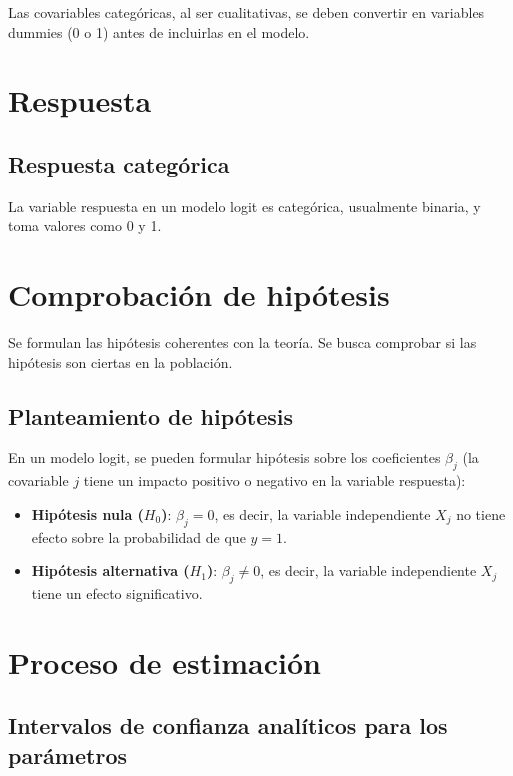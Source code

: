 \documentclass[
  letterpaper,
  DIV=11,
  numbers=noendperiod]{scrreprt}
\providecommand{\tightlist}{%
  \setlength{\itemsep}{0pt}\setlength{\parskip}{0pt}}\usepackage{longtable,booktabs,array}
\begin{document}
Las covariables categóricas, al ser cualitativas, se deben convertir en
variables dummies (0 o 1) antes de incluirlas en el modelo.

\section{Respuesta}\label{respuesta-1}

\subsection{Respuesta categórica}\label{respuesta-categuxf3rica-1}

La variable respuesta en un modelo logit es categórica, usualmente
binaria, y toma valores como 0 y 1.

\section{Comprobación de
hipótesis}\label{comprobaciuxf3n-de-hipuxf3tesis-1}

Se formulan las hipótesis coherentes con la teoría. Se busca comprobar
si las hipótesis son ciertas en la población.

\subsection{Planteamiento de
hipótesis}\label{planteamiento-de-hipuxf3tesis-1}

En un modelo logit, se pueden formular hipótesis sobre los coeficientes
\(\beta_j\) (la covariable \(j\) tiene un impacto positivo o negativo en
la variable respuesta):

\begin{itemize}
\tightlist
\item
  \textbf{Hipótesis nula (\(H_0\))}: \(\beta_j = 0\), es decir, la
  variable independiente \(X_j\) no tiene efecto sobre la probabilidad
  de que \(y = 1\).
\item
  \textbf{Hipótesis alternativa (\(H_1\))}: \(\beta_j \neq 0\), es
  decir, la variable independiente \(X_j\) tiene un efecto
  significativo.
\end{itemize}

\section{Proceso de estimación}\label{proceso-de-estimaciuxf3n-3}

\subsection{Intervalos de confianza analíticos para los
parámetros}\label{intervalos-de-confianza-analuxedticos-para-los-paruxe1metros}
\end{document}
